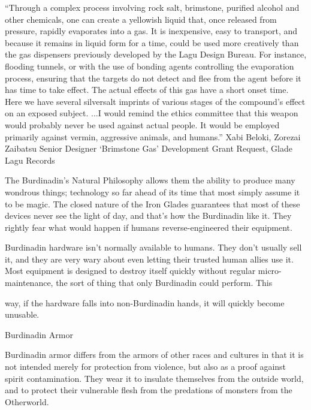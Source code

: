 \documentclass[oneside,11pt,english]{book}
\begin{document}
“Through a complex process involving rock salt, brimstone, purified alcohol and other chemicals, one can create a yellowish 
liquid that, once released from pressure, rapidly evaporates into a gas. It is inexpensive, easy to transport, and because it 
remains in liquid form for a time, could be used more creatively than the gas dispensers previously developed by the Lagu Design 
Bureau. For instance, flooding tunnels, or with the use of bonding agents controlling the evaporation process, ensuring that the 
targets do not detect and flee from the agent before it has time to take effect. The actual effects of this gas have a short onset time. 
Here we have several silversalt imprints of various stages of the compound’s effect on an exposed subject. 
...I would remind the ethics committee that this weapon would probably never be used against actual people. It would be 
employed primarily against vermin, aggressive animals, and humans.” 
Xabi Beloki, Zorezai Zaibatsu Senior Designer 
‘Brimstone Gas’ Development Grant Request, Glade Lagu Records 

 

The Burdinadin’s Natural Philosophy allows them the ability to produce many wondrous things; 
technology so far ahead of its time that most simply assume it to be magic. The closed nature of the Iron 
Glades guarantees that most of these devices never see the light of day, and that’s how the Burdinadin 
like it. They rightly fear what would happen if humans reverse-engineered their equipment. 

 

Burdinadin hardware isn’t normally available to humans. They don’t usually sell it, and they are very 
wary about even letting their trusted human allies use it. Most equipment is designed to destroy itself 
quickly without regular micro-maintenance, the sort of thing that only Burdinadin could perform. This 


way, if the hardware falls into non-Burdinadin hands, it will quickly become unusable. 

 

Burdinadin Armor 

 

Burdinadin armor differs from the armors of other races and cultures in that it is not intended merely for 
protection from violence, but also as a proof against spirit contamination. They wear it to insulate 
themselves from the outside world, and to protect their vulnerable flesh from the predations of monsters 
from the Otherworld. 
\end{document}
